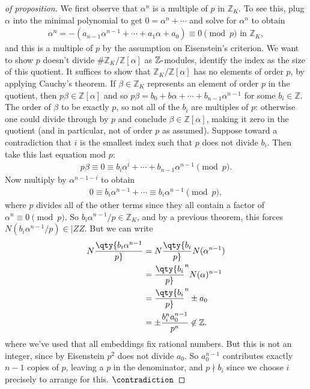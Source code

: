 \begin{proof}[of proposition]

We first observe that \(\alpha^n\) is a multiple of \(p\) in
\({\mathbb{Z}}_K\). To see this, plug \(\alpha\) into the minimal
polynomial to get \(0 = \alpha^n + \cdots\) and solve for \(\alpha^n\)
to obtain
\begin{align*}
\alpha^n = -(a_{n-1} \alpha^{n-1} + \cdots + a_1 \alpha + a_0) \equiv 0 \pmod p \text{ in } {\mathbb{Z}}_K 
,\end{align*}
and this is a multiple of \(p\) by the assumption on Eisenstein's
criterion. We want to show \(p\) doesn't divide
\(\# {\mathbb{Z}}_K/ {\mathbb{Z}}[ \alpha]\) as
\({\mathbb{Z}}{\hbox{-}}\)modules, identify the index as the size of
this quotient. It suffices to show that
\({\mathbb{Z}}_K/{\mathbb{Z}}[ \alpha]\) has no elements of order \(p\),
by applying Cauchy's theorem. If \(\beta\in {\mathbb{Z}}_K\) represents
an element of order \(p\) in the quotient, then
\(p \beta\in {\mathbb{Z}}[ \alpha]\) and so
\(p \beta = b_0 + b \alpha + \cdots + b_{n-1} \alpha^{n-1}\) for some
\(b_i \in {\mathbb{Z}}\). The order of \(\beta\) to be exactly \(p\), so
not all of the \(b_i\) are multiples of \(p\): otherwise one could
divide through by \(p\) and conclude \(\beta\in {\mathbb{Z}}[ \alpha]\),
making it zero in the quotient (and in particular, not of order \(p\) as
assumed). Suppose toward a contradiction that \(i\) is the smallest
index such that \(p\) does not divide \(b_i\). Then take this last
equation mod \(p\):
\begin{align*}
p \beta \equiv 0 \equiv b_i \alpha^{i} + \cdots + b_{n-1} \alpha^{n-1} \pmod p
.\end{align*}
Now multiply by \(\alpha^{n-1-i}\) to obtain
\begin{align*}
0 \equiv b_i \alpha^{n-1} + \cdots \equiv b_i \alpha^{n-1} \pmod p
,\end{align*}
where \(p\) divides all of the other terms since they all contain a
factor of \(\alpha^n \equiv 0 \pmod p\). So
\(b_i \alpha^{n-1} /p \in {\mathbb{Z}}_K\), and by a previous theorem,
this forces \(N( b_i \alpha^{n-1} / p ) \in |ZZ\). But we can write
\begin{align*}
N \qty{ b_i \alpha^{n-1} \over p }
&=
N \qty{ b_i \over p} N( \alpha^{n-1} ) \\
&= \qty{b_i \over p}^{n} N( \alpha)^{n-1} \\
&= \qty{b_i \over p}^{n} \pm a_0 \\
&= \pm {b_i^n a_0^{n-1} \over p^n } \not\in {\mathbb{Z}}
.\end{align*}
where we've used that all embeddings fix rational numbers. But this is
not an integer, since by Eisenstein \(p^2\) does not divide \(a_0\). So
\(a_0^{n-1}\) contributes exactly \(n-1\) copies of \(p\), leaving a
\(p\) in the denominator, and \(p\nmid b_i\) since we choose \(i\)
precisely to arrange for this. \(\contradiction\)

\end{proof}

